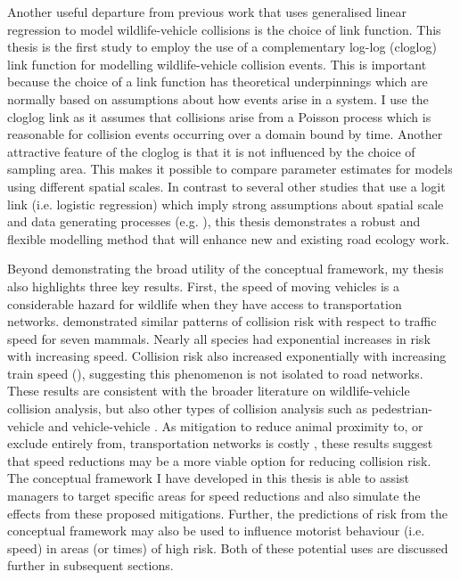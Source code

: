 Another useful departure from previous work that uses generalised linear regression to model wildlife-vehicle collisions is the choice of link function. This thesis is the first study to employ the use of a complementary log-log (cloglog) link function for modelling wildlife-vehicle collision events. This is important because the choice of a link function has theoretical underpinnings which are normally based on assumptions about how events arise in a system. I use the cloglog link as it assumes that collisions arise from a Poisson process which is reasonable for collision events occurring over a domain bound by time. Another attractive feature of the cloglog is that it is not influenced by the choice of sampling area. This makes it possible to compare parameter estimates for models using different spatial scales.  In contrast to several other studies that use a logit link (i.e. logistic regression) which imply strong assumptions about spatial scale and data generating processes (e.g. \cite{}), this thesis demonstrates a robust and flexible modelling method that will enhance new and existing road ecology work.

Beyond demonstrating the broad utility of the conceptual framework, my thesis also highlights three key results. First, the speed of moving vehicles is a considerable hazard for wildlife when they have access to transportation networks.  demonstrated similar patterns of collision risk with respect to traffic speed for seven mammals. Nearly all species had exponential increases in risk with increasing speed. Collision risk also increased exponentially with increasing train speed (), suggesting this phenomenon is not isolated to road networks. These results are consistent with the broader literature on wildlife-vehicle collision analysis, but also other types of collision analysis such as pedestrian-vehicle \citep{} and vehicle-vehicle \citep{}. As mitigation to reduce animal proximity to, or exclude entirely from, transportation networks is costly \citep{}, these results suggest that speed reductions may be a more viable option for reducing collision risk. The conceptual framework I have developed in this thesis is able to assist managers to target specific areas for speed reductions and also simulate the effects from these proposed mitigations. Further, the predictions of risk from the conceptual framework may also be used to influence motorist behaviour (i.e. speed) in areas (or times) of high risk. Both of these potential uses are discussed further in subsequent sections.

